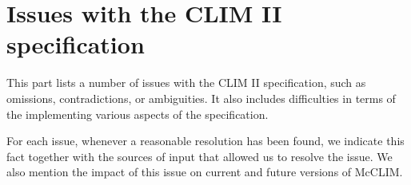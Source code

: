 \part{Issues with the CLIM II specification}

This part lists a number of issues with the CLIM II specification,
such as omissions, contradictions, or ambiguities.  It also includes
difficulties in terms of the implementing various aspects of the
specification.

For each issue, whenever a reasonable resolution has been found, we
indicate this fact together with the sources of input that allowed us
to resolve the issue.  We also mention the impact of this issue on
current and future versions of McCLIM.
